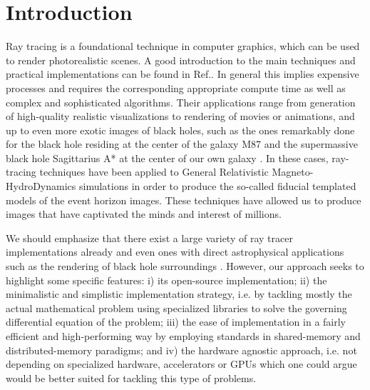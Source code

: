 
\section{Introduction}
\label{sec:intro}


Ray tracing is a foundational technique in computer graphics, which can be used
to render photorealistic scenes.
A good introduction to the main techniques and practical implementations can be found
in Ref.\cite{raytracing_in_one_weekend}.
In general this implies expensive processes and requires the corresponding appropriate compute time
as well as complex and sophisticated algorithms.
Their applications \cite{Peddie2019_appns} range from generation of high-quality realistic visualizations to
rendering of movies or animations, and up to even more exotic images of black holes,
such as the ones remarkably done for the black hole residing at the center of the galaxy M87 \cite{M87_EHT_i}
and the supermassive black hole Sagittarius A* at the center of our own galaxy \cite{SagA_EHT_i}.
In these cases, ray-tracing techniques have been applied to
General Relativistic Magneto-HydroDynamics simulations in order to produce 
the so-called fiducial templated models of the event horizon images.
These techniques have allowed us to produce images that have captivated the minds and interest of millions.

We should emphasize that there exist a large variety of ray tracer implementations already 
\cite{imbens2023graphicalprocessinggeodesicpropagation,10.2312/EGPGV/EGPGV12/051-060,7539599_OSPRay}
and even ones with direct astrophysical applications such as the rendering of black hole surroundings
\cite{10.2312:vmv.20221208,sharma2023mahakalapythonbasedmodularraytracing,James_2015}.
However, our approach seeks to highlight some specific features:
i) its open-source implementation;
ii) the minimalistic and simplistic implementation strategy, i.e. by tackling
mostly the actual mathematical problem using specialized libraries
to solve the governing differential equation of the problem;
iii) the ease of implementation in a fairly efficient and high-performing
way by employing standards in shared-memory and distributed-memory paradigms;
and iv) the hardware agnostic approach, i.e. not depending on specialized hardware, accelerators or GPUs \cite{Peddie2019_hardware}
which one could argue would be better suited for tackling this type of problems.

